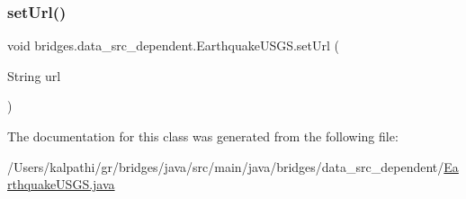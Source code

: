 \mbox{\label{classbridges_1_1data__src__dependent_1_1_earthquake_u_s_g_s_aaa9d26333e7b80d0f72da58ea2ad41d1}} 
\subsubsection{\texorpdfstring{setUrl()}{setUrl()}}
{\footnotesize\ttfamily void bridges.\+data\+\_\+src\+\_\+dependent.\+Earthquake\+U\+S\+G\+S.\+set\+Url (\begin{DoxyParamCaption}\item[{String}]{url }\end{DoxyParamCaption})}



The documentation for this class was generated from the following file\+:\begin{DoxyCompactItemize}
\item 
/\+Users/kalpathi/gr/bridges/java/src/main/java/bridges/data\+\_\+src\+\_\+dependent/\mbox{\hyperlink{_earthquake_u_s_g_s_8java}{Earthquake\+U\+S\+G\+S.\+java}}\end{DoxyCompactItemize}
